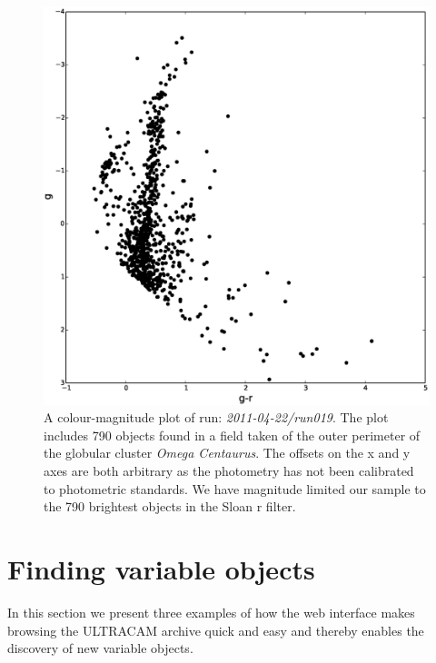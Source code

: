 \begin{figure}
\centering
\includegraphics[width=120mm]{images/2011-04-22-run019-omegacen-colourmagnitude.eps}
\caption{A colour-magnitude plot of run: \emph{2011-04-22/run019}. The plot includes 790 objects found in a field taken of the outer perimeter of the globular cluster \emph{Omega Centaurus}. The offsets on the x and y axes are both arbitrary as the photometry has not been calibrated to photometric standards. We have magnitude limited our sample to the 790 brightest objects in the Sloan r filter.}
\label{fig:OmegaCen-colourmagnitude}
\end{figure}

\section{Finding variable objects}
In this section we present three examples of how the web interface makes browsing the ULTRACAM archive quick and easy and thereby enables the discovery of new variable objects. 

